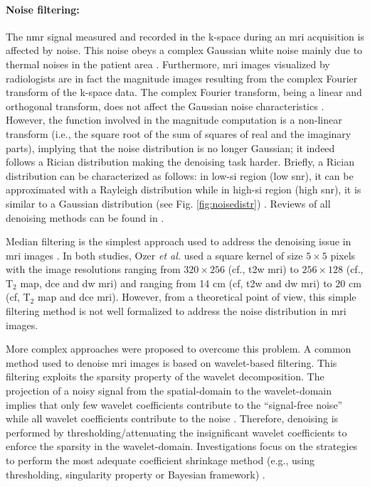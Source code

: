 \paragraph{Noise filtering:} The \ac{nmr} signal measured and recorded in the k-space during an \ac{mri} acquisition is affected by noise.
This noise obeys a complex Gaussian white noise mainly due to thermal noises in the patient area \cite{Nowak1999}.
Furthermore, \ac{mri} images visualized by radiologists are in fact the magnitude images resulting from the complex Fourier transform of the k-space data.
The complex Fourier transform, being a linear and orthogonal transform, does not affect the Gaussian noise characteristics \cite{Nowak1999}.
However, the function involved in the magnitude computation is a non-linear transform (i.e., the square root of the sum of squares of real and the imaginary parts), implying that the noise distribution is no longer Gaussian; it indeed follows a Rician distribution making the denoising task harder.
Briefly, a Rician distribution can be characterized as follows: in low-\ac{si} region (low \ac{snr}), it can be approximated with a Rayleigh distribution while in high-\ac{si} region (high \ac{snr}), it is similar to a Gaussian distribution (see Fig. \ref{fig:noisedistr}) \cite{Manjon2008}.
Reviews of all denoising methods can be found in \cite{Buades2005,Mohan2014}.

Median filtering is the simplest approach used to address the denoising issue in \ac{mri} images \cite{Ozer2009,Ozer2010}.
In both studies, Ozer \textit{et al.} used a square kernel of size $5 \times 5$ pixels with the image resolutions ranging from $320 \times 256$ (cf., \ac{t2w} \ac{mri}) to $256 \times 128$ (cf., T$_2$ map, \ac{dce} and \ac{dw} \ac{mri}) and  ranging from 14 cm (cf, \ac{t2w} and \ac{dw} \ac{mri}) to 20 cm (cf, T$_2$ map and \ac{dce} \ac{mri}).
However, from a theoretical point of view, this simple filtering method is not well formalized to address the noise distribution in \ac{mri} images.

More complex approaches were proposed to overcome this problem.
A common method used to denoise \ac{mri} images is based on wavelet-based filtering.
This filtering exploits the sparsity property of the wavelet decomposition.
The projection of a noisy signal from the spatial-domain to the wavelet-domain implies that only few wavelet coefficients contribute to the ``signal-free noise'' while all wavelet coefficients contribute to the noise \cite{Donoho1994}.
Therefore, denoising is performed by thresholding/attenuating the insignificant wavelet coefficients to enforce the sparsity in the wavelet-domain.
Investigations focus on the strategies to perform the most adequate coefficient shrinkage method (e.g., using thresholding, singularity property or Bayesian framework) \cite{Pizurica2002}.

